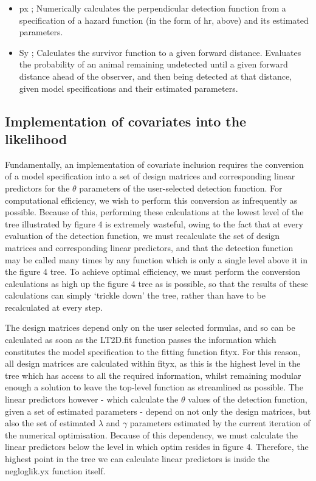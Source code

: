 \documentclass[11pt]{article}
\begin{document}
\begin{multicols}{2}
\begin{itemize}
\item px ; Numerically calculates the perpendicular detection function from a specification of a hazard function (in the form of hr, above) and its estimated parameters.

\item Sy ; Calculates the survivor function to a given forward distance. Evaluates the probability of an animal remaining undetected until a given forward distance ahead of the observer, and then being detected at that distance, given model specifications and their estimated parameters.
\end{itemize}

\subsection{Implementation of covariates into the likelihood}
Fundamentally, an implementation of covariate inclusion requires the conversion of a model specification into a set of design matrices and corresponding linear predictors for the $\theta$ parameters of the user-selected detection function. For computational efficiency, we wish to perform this conversion as infrequently as possible. Because of this, performing these calculations at the lowest level of the tree illustrated by figure 4 is extremely wasteful, owing to the fact that at every evaluation of the detection function, we must recalculate the set of design matrices and corresponding linear predictors, and that the detection function may be called many times by any function which is only a single level above it in the figure 4 tree. To achieve optimal efficiency, we must perform the conversion calculations as high up the figure 4 tree as is possible, so that the results of these calculations can simply `trickle down' the tree, rather than have to be recalculated at every step.

The design matrices depend only on the user selected formulas, and so can be calculated as soon as the LT2D.fit function passes the information which constitutes the model specification to the fitting function fityx. For this reason, all design matrices are calculated within fityx, as this is the highest level in the tree which has access to all the required information, whilst remaining modular enough a solution to leave the top-level function as streamlined as possible. The linear predictors however - which calculate the $\theta$ values of the detection function, given a set of estimated parameters - depend on not only the design matrices, but also the set of estimated $\lambda$ and $\gamma$ parameters estimated by the current iteration of the numerical optimisation. Because of this dependency, we must calculate the linear predictors below the level in which optim resides in figure 4. Therefore, the highest point in the tree we can calculate linear predictors is inside the negloglik.yx function itself. 


\end{multicols}
\end{document}
